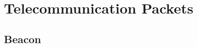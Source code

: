 %
%
%
%
%

%
%
%
%
%
%

\chapter{Telecommunication Packets} \label{anx:packets}


\section{Beacon}

